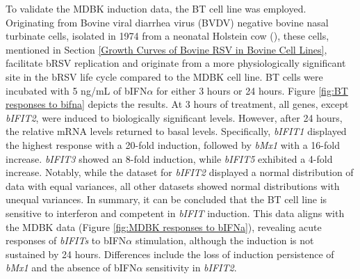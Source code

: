 To validate the MDBK induction data, the BT cell line was employed. Originating from Bovine viral diarrhea virus (BVDV) negative bovine nasal turbinate cells, isolated in 1974 from a neonatal Holstein cow (\cite{McClurkin1974ComparisonVirus.}), these cells, mentioned in Section \ref{Growth Curves of Bovine RSV in Bovine Cell Lines}, facilitate bRSV replication and originate from a more physiologically significant site in the bRSV life cycle compared to the MDBK cell line. BT cells were incubated with 5 ng/mL of bIFN\(\alpha\) for either 3 hours or 24 hours. Figure \ref{fig:BT responses to bifna} depicts the results. At 3 hours of treatment, all genes, except \textit{bIFIT2}, were induced to biologically significant levels. However, after 24 hours, the relative mRNA levels returned to basal levels. Specifically, \textit{bIFIT1} displayed the highest response with a 20-fold induction, followed by \textit{bMx1} with a 16-fold increase. \textit{bIFIT3} showed an 8-fold induction, while \textit{bIFIT5} exhibited a 4-fold increase. Notably, while the dataset for \textit{bIFIT2} displayed a normal distribution of data with equal variances, all other datasets showed normal distributions with unequal variances. In summary, it can be concluded that the BT cell line is sensitive to interferon and competent in \textit{bIFIT} induction. This data aligns with the MDBK data (Figure \ref{fig:MDBK responses to bIFNa}), revealing acute responses of \textit{bIFITs} to bIFN\(\alpha\) stimulation, although the induction is not sustained by 24 hours. Differences include the loss of induction persistence of \textit{bMx1} and the absence of bIFN\(\alpha\) sensitivity in \textit{bIFIT2}.

